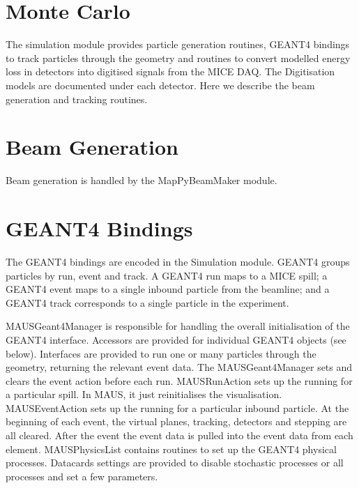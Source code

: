 \section{Monte Carlo}
The simulation module provides particle generation routines, GEANT4 bindings to track particles through the geometry and routines to convert modelled energy loss in detectors into digitised signals from the MICE DAQ. The Digitisation models are documented under each detector. Here we describe the beam generation and tracking routines.

\section{Beam Generation}
Beam generation is handled by the MapPyBeamMaker module.

\section{GEANT4 Bindings}
The GEANT4 bindings are encoded in the Simulation module. GEANT4 groups particles by run, event and track. A GEANT4 run maps to a MICE spill; a GEANT4 event maps to a single inbound particle from the beamline; and a GEANT4 track corresponds to a single particle in the experiment.

\begin{itemize}
\li MAUSGeant4Manager is responsible for handling the overall initialisation of the GEANT4 interface. Accessors are provided for individual GEANT4 objects (see below). Interfaces are provided to run one or many particles through the geometry, returning the relevant event data. The MAUSGeant4Manager sets and clears the event action before each run.
\li MAUSRunAction sets up the running for a particular spill. In MAUS, it just reinitialises the visualisation.
\li MAUSEventAction sets up the running for a particular inbound particle. At the beginning of each event, the virtual planes, tracking, detectors and stepping are all cleared. After the event the event data is pulled into the event data from each element. 
\li MAUSPhysicsList contains routines to set up the GEANT4 physical processes. Datacards settings are provided to disable stochastic processes or all processes and set a few parameters.
\end{itemize}





